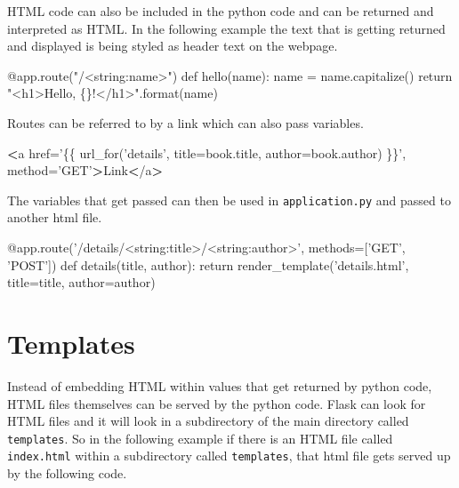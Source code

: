 \documentclass[]{book}
\newenvironment{Shaded}{\begin{snugshade}}{\end{snugshade}}
\newcommand{\BuiltInTok}[1]{#1}
\newcommand{\ExtensionTok}[1]{#1}
\newcommand{\NormalTok}[1]{#1}
\newcommand{\OperatorTok}[1]{\textcolor[rgb]{0.81,0.36,0.00}{\textbf{#1}}}
\newcommand{\StringTok}[1]{\textcolor[rgb]{0.31,0.60,0.02}{#1}}
\begin{document}
HTML code can also be included in the python code and can be returned and interpreted as HTML. In the following example the text that is getting returned and displayed is being styled as header text on the webpage.

\begin{Shaded}
\begin{Highlighting}[]
\ExtensionTok{@app.route}\NormalTok{(}\StringTok{"/<string:name>"}\NormalTok{)}
\ExtensionTok{def}\NormalTok{ hello(name)}\BuiltInTok{:}
    \ExtensionTok{name}\NormalTok{ = name.capitalize()}
    \BuiltInTok{return} \StringTok{"<h1>Hello, \{\}!</h1>"}\NormalTok{.format(name)}
\end{Highlighting}
\end{Shaded}

Routes can be referred to by a link which can also pass variables.

\begin{Shaded}
\begin{Highlighting}[]
\OperatorTok{<}\ExtensionTok{a}\NormalTok{ href=}\StringTok{'\{\{ url_for('}\NormalTok{details}\StringTok{', title=book.title, author=book.author) \}\}'}\NormalTok{, method=}\StringTok{'GET'}\OperatorTok{>}\NormalTok{Link}\OperatorTok{<}\NormalTok{/a}\OperatorTok{>}
\end{Highlighting}
\end{Shaded}

The variables that get passed can then be used in \texttt{application.py} and passed to another html file.

\begin{Shaded}
\begin{Highlighting}[]
\ExtensionTok{@app.route}\NormalTok{(}\StringTok{'/details/<string:title>/<string:author>'}\NormalTok{, methods=[}\StringTok{'GET'}\NormalTok{, }\StringTok{'POST'}\NormalTok{])}
\ExtensionTok{def}\NormalTok{ details(title, author)}\BuiltInTok{:}                                                   
    \BuiltInTok{return}\NormalTok{ render_template(}\StringTok{'details.html'}\NormalTok{, title=title, author=author)        }
\end{Highlighting}
\end{Shaded}

\hypertarget{templates}{%
\section{Templates}\label{templates}}

Instead of embedding HTML within values that get returned by python code, HTML files themselves can be served by the python code. Flask can look for HTML files and it will look in a subdirectory of the main directory called \texttt{templates}. So in the following example if there is an HTML file called \texttt{index.html} within a subdirectory called \texttt{templates}, that html file gets served up by the following code.
\end{document}
